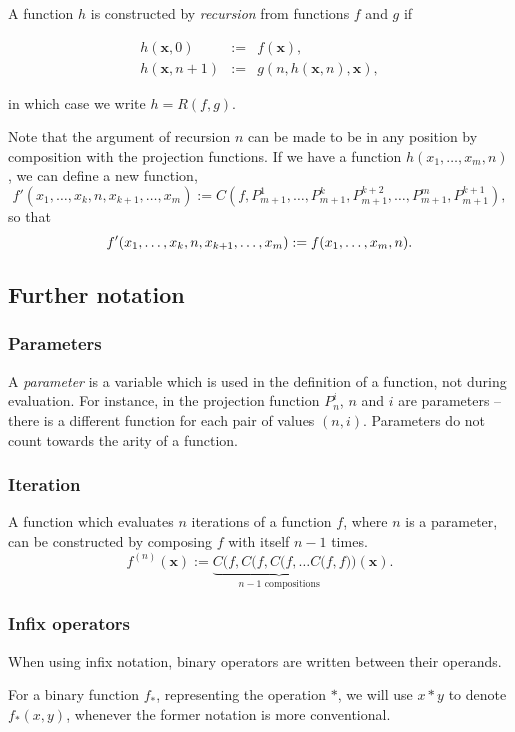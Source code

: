 \documentclass[a4paper]{article}
\newcommand{\xvec}{\mathbf{x}}	%
\theoremstyle{plain}
\theoremstyle{definition}
\begin{document}
A function $h$ is constructed by {\it recursion} from functions $f$ and $g$ if

\begin{eqnarray*}
	h(\xvec,0) & := & f(\xvec), \\
	h(\xvec,n+1) & := & g(n,h(\xvec,n),\xvec),
\end{eqnarray*} 

in which case we write $h = R(f,g)$.

Note that the argument of recursion $n$ can be made to be in any position by composition with the projection functions. If we have a function $h(x_1,\dots,x_m,n)$, we can define a new function,
\[ f'(x_1, \dots, x_k, n, x_{k+1}, \dots, x_m) := C(f, P_{m+1}^1, \dots, P_{m+1}^k, P_{m+1}^{k+2},\dots, P_{m+1}^m, P_{m+1}^{k+1}), \]
so that 
\[ f'(x_1, \dots, x_k, n, x_{k+1}, \dots, x_m) := f(x_1, \dots, x_m, n). \\ \]

\subsection{Further notation}

\subsubsection{Parameters}
A {\it parameter} is a variable which is used in the definition of a function, not during evaluation. For instance, in the projection function $P_n^i$, $n$ and $i$ are parameters -- there is a different function for each pair of values $(n,i)$. Parameters do not count towards the arity of a function.

\subsubsection{Iteration}
A function which evaluates $n$ iterations of a function $f$, where $n$ is a parameter, can be constructed by composing $f$ with itself $n-1$ times.
\[f^{(n)}(\xvec) := \underbrace{C(f,C(f,C(f, \dots C(f,f}_{n-1 \textrm{ compositions}}) )(\xvec).\]

\subsubsection{Infix operators}
When using infix notation, binary operators are written between their operands.

For a binary function $f_{\ast}$, representing the operation $\ast$, we will use $x \ast y$ to denote $f_{\ast}(x,y)$, whenever the former notation is more conventional.
\end{document}
